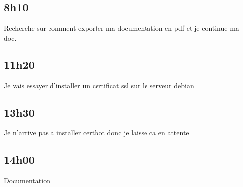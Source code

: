 \documentclass[a4paper,12pt,french]{sphinxmanual}
\begin{document}
\subsection{8h10}
\label{\detokenize{logbook:id192}}
\sphinxAtStartPar
Recherche sur comment exporter ma documentation en pdf et je continue ma doc.


\subsection{11h20}
\label{\detokenize{logbook:id193}}
\sphinxAtStartPar
Je vais essayer d’installer un certificat ssl sur le serveur debian


\subsection{13h30}
\label{\detokenize{logbook:id194}}
\sphinxAtStartPar
Je n’arrive pas a installer certbot donc je laisse ca en attente


\subsection{14h00}
\label{\detokenize{logbook:id195}}
\sphinxAtStartPar
Documentation



\renewcommand{\indexname}{Index}
\printindex
\end{document}
